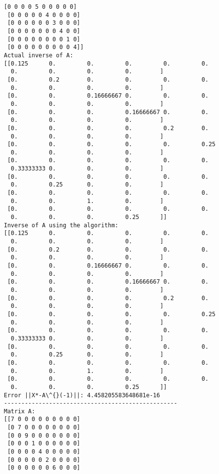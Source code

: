 \documentclass[11pt]{article}
\begin{document}
\begin{Verbatim}[commandchars=\\\{\}]
 [0 0 0 0 5 0 0 0 0 0]
 [0 0 0 0 0 4 0 0 0 0]
 [0 0 0 0 0 0 3 0 0 0]
 [0 0 0 0 0 0 0 4 0 0]
 [0 0 0 0 0 0 0 0 1 0]
 [0 0 0 0 0 0 0 0 0 4]]
Actual inverse of A:
[[0.125      0.         0.         0.         0.         0.
  0.         0.         0.         0.        ]
 [0.         0.2        0.         0.         0.         0.
  0.         0.         0.         0.        ]
 [0.         0.         0.16666667 0.         0.         0.
  0.         0.         0.         0.        ]
 [0.         0.         0.         0.16666667 0.         0.
  0.         0.         0.         0.        ]
 [0.         0.         0.         0.         0.2        0.
  0.         0.         0.         0.        ]
 [0.         0.         0.         0.         0.         0.25
  0.         0.         0.         0.        ]
 [0.         0.         0.         0.         0.         0.
  0.33333333 0.         0.         0.        ]
 [0.         0.         0.         0.         0.         0.
  0.         0.25       0.         0.        ]
 [0.         0.         0.         0.         0.         0.
  0.         0.         1.         0.        ]
 [0.         0.         0.         0.         0.         0.
  0.         0.         0.         0.25      ]]
Inverse of A using the algorithm:
[[0.125      0.         0.         0.         0.         0.
  0.         0.         0.         0.        ]
 [0.         0.2        0.         0.         0.         0.
  0.         0.         0.         0.        ]
 [0.         0.         0.16666667 0.         0.         0.
  0.         0.         0.         0.        ]
 [0.         0.         0.         0.16666667 0.         0.
  0.         0.         0.         0.        ]
 [0.         0.         0.         0.         0.2        0.
  0.         0.         0.         0.        ]
 [0.         0.         0.         0.         0.         0.25
  0.         0.         0.         0.        ]
 [0.         0.         0.         0.         0.         0.
  0.33333333 0.         0.         0.        ]
 [0.         0.         0.         0.         0.         0.
  0.         0.25       0.         0.        ]
 [0.         0.         0.         0.         0.         0.
  0.         0.         1.         0.        ]
 [0.         0.         0.         0.         0.         0.
  0.         0.         0.         0.25      ]]
Error ||X*-A\^{}(-1)||: 4.458205583648681e-16
--------------------------------------------------
Matrix A:
[[7 0 0 0 0 0 0 0 0 0]
 [0 7 0 0 0 0 0 0 0 0]
 [0 0 9 0 0 0 0 0 0 0]
 [0 0 0 1 0 0 0 0 0 0]
 [0 0 0 0 4 0 0 0 0 0]
 [0 0 0 0 0 2 0 0 0 0]
 [0 0 0 0 0 0 6 0 0 0]

\end{Verbatim}
\end{document}
